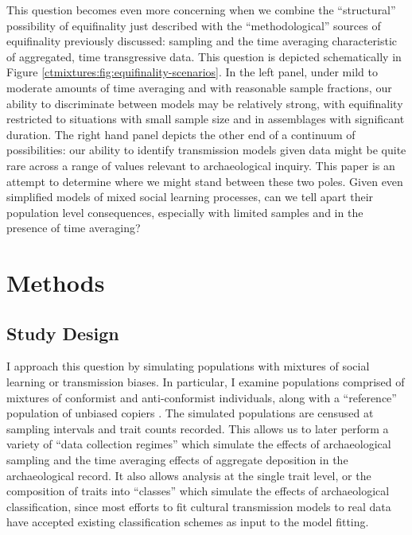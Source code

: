 This question becomes even more concerning when we combine the “structural” possibility of equifinality just described with the “methodological” sources of equifinality previously discussed:  sampling and the time averaging characteristic of aggregated, time transgressive data.  This question is depicted schematically in Figure \ref{ctmixtures:fig:equifinality-scenarios}.  In the left panel, under mild to moderate amounts of time averaging and with reasonable sample fractions, our ability to discriminate between models may be relatively strong, with equifinality restricted to situations with small sample size and in assemblages with significant duration.  The right hand panel depicts the other end of a continuum of possibilities:  our ability to identify transmission models given data might be quite rare across a range of values relevant to archaeological inquiry.  This paper is an attempt to determine where we might stand between these two poles.  Given even simplified models of mixed social learning processes, can we tell apart their population level consequences, especially with limited samples and in the presence of time averaging?

\section{Methods}\label{ctmixtures:sec:methods}

\subsection{Study Design}\label{ctmixtures:sec:study-design}

I approach this question by simulating populations with mixtures of social learning or transmission biases.  In particular, I examine populations comprised of mixtures of conformist and anti-conformist individuals, along with a ``reference'' population of unbiased copiers \citep{BR1985}.  The simulated populations are censused at sampling intervals and trait counts recorded.  This allows us to later perform a variety of ``data collection regimes'' which simulate the effects of archaeological sampling and the time averaging effects of aggregate deposition in the archaeological record.  It also allows analysis at the single trait level, or the composition of traits into ``classes'' which simulate the effects of archaeological classification, since most efforts to fit cultural transmission models to real data have accepted existing classification schemes as input to the model fitting.  

